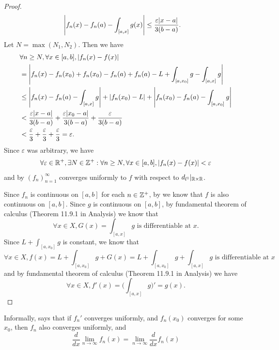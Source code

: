 \begin{proof}
\begin{align*}
             & \abs{f_n(x) - f_n(a) - \int_{[a, x]} g(x)} \leq \dfrac{\varepsilon \abs{x - a}}{3(b - a)}.
  \end{align*}
  Let \(N = \max(N_1, N_2)\).
  Then we have
  \begin{align*}
     & \forall n \geq N, \forall x \in [a, b], \abs{f_n(x) - f(x)}                                                               \\
     & = \abs{f_n(x) - f_n(x_0) + f_n(x_0) - f_n(a) + f_n(a) - L + \int_{[a, x_0]} g - \int_{[a, x]} g}                          \\
     & \leq \abs{f_n(x) - f_n(a) - \int_{[a, x]} g} + \abs{f_n(x_0) - L} + \abs{f_n(x_0) - f_n(a) - \int_{[a, x_0]} g}           \\
     & < \dfrac{\varepsilon \abs{x - a}}{3(b - a)} + \dfrac{\varepsilon \abs{x_0 - a}}{3(b - a)} + \dfrac{\varepsilon}{3(b - a)} \\
     & < \dfrac{\varepsilon}{3} + \dfrac{\varepsilon}{3} + \dfrac{\varepsilon}{3} = \varepsilon.
  \end{align*}
  Since \(\varepsilon\) was arbitrary, we have
  \[
    \forall \varepsilon \in \mathbb{R}^+, \exists N \in \mathbb{Z}^+ : \forall n \geq N, \forall x \in [a, b], \left\lvert f_n(x) - f(x)\right\rvert < \varepsilon
  \]
  and by  \((f_n)_{n = 1}^\infty\) converges uniformly to \(f\) with respect to \(d_{l^1}|_{\mathbb{R} \times \mathbb{R}}\).

  Since \(f_n\) is continuous on \([a, b]\) for each \(n \in \mathbb{Z}^+\), by  we know that \(f\) is also continuous on \([a, b]\).
  Since \(g\) is continuous on \([a, b]\), by fundamental theorem of calculus (Theorem 11.9.1 in Analysis) we know that
  \[
    \forall x \in X, G(x) = \int_{[a, x]} g \text{ is differentiable at } x.
  \]
  Since \(L + \int_{[a, x_0]} g\) is constant, we know that
  \[
    \forall x \in X, f(x) = L + \int_{[a, x_0]} g + G(x) = L + \int_{[a, x_0]} g + \int_{[a, x]} g \text{ is differentiable at } x
  \]
  and by fundamental theorem of calculus (Theorem 11.9.1 in Analysis) we have
  \[
    \forall x \in X, f'(x) = \bigg(\int_{[a, x]} g\bigg)' = g(x).
  \]
\end{proof}

\begin{note}
  Informally,  says that if \(f_n'\) converges uniformly, and \(f_n(x_0)\) converges for some \(x_0\), then \(f_n\) also converges uniformly, and
  \[
    \dfrac{d}{dx} \lim_{n \to \infty} f_n(x) = \lim_{n \to \infty} \dfrac{d}{dx} f_n(x)
  \]
\end{note}

